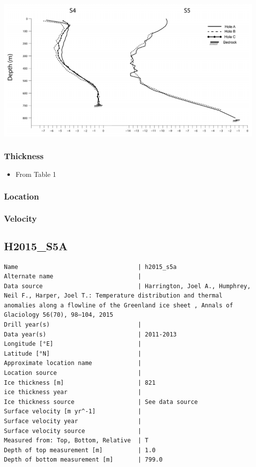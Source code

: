\documentclass[article,a4paper,times,11pt,twoside]{article}
\begin{document}
\begin{center}
\includegraphics[width=.9\linewidth]{h2015_s4c/harrington_2015_fig2_S4_S5.png}
\end{center}

\subsubsection{Thickness}
\label{sec:orgb3ffd86}

\begin{itemize}
\item From \textcite{harrington_2015} Table 1
\end{itemize}

\subsubsection{Location}
\label{sec:orgf8a526f}

\subsubsection{Velocity}
\label{sec:org41649d5}
\clearpage
\subsection{H2015\_S5A}
\label{sec:org6566134}
\begin{verbatim}
Name                                  | h2015_s5a
Alternate name                        | 
Data source                           | Harrington, Joel A., Humphrey, Neil F., Harper, Joel T.: Temperature distribution and thermal anomalies along a flowline of the Greenland ice sheet , Annals of Glaciology 56(70), 98–104, 2015 
Drill year(s)                         | 
Data year(s)                          | 2011-2013
Longitude [°E]                        | 
Latitude [°N]                         | 
Approximate location name             | 
Location source                       | 
Ice thickness [m]                     | 821
ice thickness year                    | 
Ice thickness source                  | See data source
Surface velocity [m yr^-1]            | 
Surface velocity year                 | 
Surface velocity source               | 
Measured from: Top, Bottom, Relative  | T
Depth of top measurement [m]          | 1.0
Depth of bottom measurement [m]       | 799.0
\end{verbatim}
\end{document}
